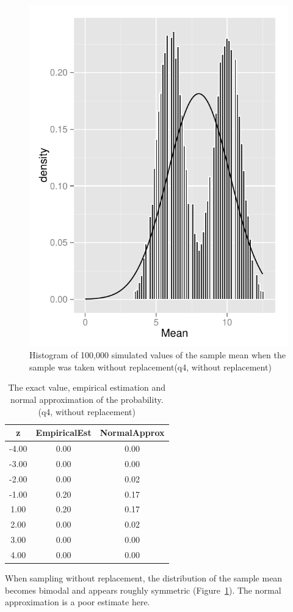 \documentclass[11pt]{article}
\begin{document}
\begin{figure}
\centering
\includegraphics[scale=1]{histogram_4e-1.pdf}
\caption{Histogram of 100,000 simulated values of the sample mean when the sample was taken without replacement(q4, without replacement)}\label{fig:q4e}
\end{figure}

\begin{table}[H]
\centering
\begin{tabular}{|c|cc|}
  \hline
z & EmpiricalEst & NormalApprox \\ 
  \hline
-4.00 & 0.00 & 0.00 \\ 
  -3.00 & 0.00 & 0.00 \\ 
  -2.00 & 0.00 & 0.02 \\ 
  -1.00 & 0.20 & 0.17 \\ 
  1.00 & 0.20 & 0.17 \\ 
  2.00 & 0.00 & 0.02 \\ 
  3.00 & 0.00 & 0.00 \\ 
  4.00 & 0.00 & 0.00 \\ 
   \hline
\end{tabular}
\caption{The exact value, empirical estimation and normal approximation of the probability. (q4, without replacement)} \label{tab:q4e}
\end{table}


\noindent When sampling without replacement, the distribution of the sample mean becomes bimodal and appears roughly symmetric (Figure~\ref{fig:q4e}).  The normal approximation is a poor estimate here.
\end{document}
